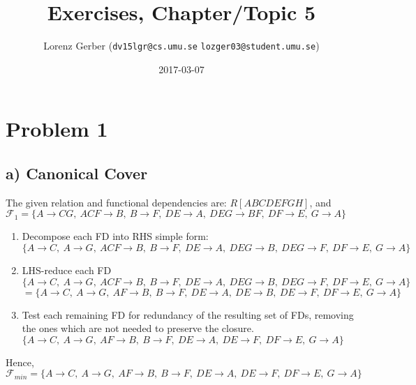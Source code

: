 \documentclass[a4paper,11pt,twoside]{article}
\title{Exercises, Chapter/Topic 5}
\author{Lorenz Gerber ({\tt{dv15lgr@cs.umu.se}} {\tt{lozger03@student.umu.se}})}
\date{2017-03-07}
\newcommand{\fdep}[2]{{\mathit{#1}} \rightarrow {\mathit{#2}}}
\begin{document}
\lstset{language=C}
\maketitle
\thispagestyle{empty}
\thispagestyle{empty}
\newpage

\clearpage
{}

\section*{Problem 1}
\subsection*{a) Canonical Cover}
The given relation and functional dependencies are: $R[ABCDEFGH]$, and\\
$\mathcal{F}_{1}=\{\fdep{A}{CG},\ \fdep{ACF}{B},\ \fdep{B}{F},\ \fdep{DE}{A},\ \fdep{DEG}{BF},\ \fdep{DF}{E},\ \fdep{G}{A}\}$


\begin{enumerate}
\item Decompose each FD into RHS simple form: \\
  $\{\fdep{A}{C},\ \fdep{A}{G},\ \fdep{ACF}{B},\ \fdep{B}{F},\ \fdep{DE}{A},\ \fdep{DEG}{B},\ \fdep{DEG}{F},\ \fdep{DF}{E},\ \fdep{G}{A}\}$\\
\item LHS-reduce each FD
  $\{\fdep{A}{C},\ \fdep{A}{G},\ \fdep{ACF}{B},\ \fdep{B}{F},\ \fdep{DE}{A},\ \fdep{DEG}{B},\ \fdep{DEG}{F},\ \fdep{DF}{E},\ \fdep{G}{A}\}$\\
  $= \{\fdep{A}{C},\ \fdep{A}{G},\ \fdep{AF}{B},\ \fdep{B}{F},\ \fdep{DE}{A},\ \fdep{DE}{B},\ \fdep{DE}{F},\ \fdep{DF}{E},\ \fdep{G}{A}\}$\\
\item Test each remaining FD for redundancy of the resulting set of FDs, removing the ones which are not needed to preserve the closure.
  $ \{\fdep{A}{C},\ \fdep{A}{G},\ \fdep{AF}{B},\ \fdep{B}{F},\ \fdep{DE}{A},\ \fdep{DE}{F},\ \fdep{DF}{E},\ \fdep{G}{A}\}$\\
\end{enumerate}

Hence, $\mathcal{F}_{min}=\{\fdep{A}{C},\ \fdep{A}{G},\ \fdep{AF}{B},\ \fdep{B}{F},\ \fdep{DE}{A},\ \fdep{DE}{F},\ \fdep{DF}{E},\ \fdep{G}{A}\}$  
\end{document}
